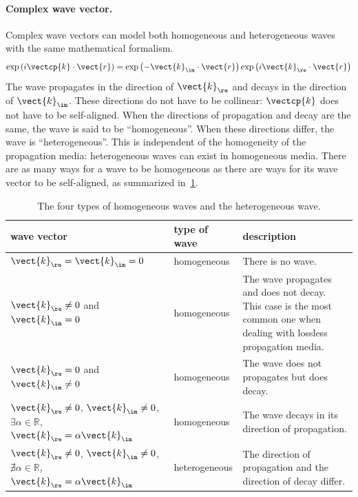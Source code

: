 \begin{refsection}
\paragraph{Complex wave vector.}
\label{sec:complex_wave_vector}
Complex wave vectors can model both homogeneous and heterogeneous waves with the same mathematical formalism.
\begin{equation}
    \exp \left( i \vectcp{k} \cdot \vect{r} \right)
    =
    \exp \left( - \vect{k}_\im \cdot \vect{r} \right)
    \exp \left( i \vect{k}_\re \cdot \vect{r} \right)
\end{equation}
The wave propagates in the direction of $\vect{k}_\re$
and decays in the direction of $\vect{k}_\im$.
These directions do not have to be collinear: $\vectcp{k}$ does not have to be self-aligned.
When the directions of propagation and decay are the same, the wave is said to be ``homogeneous''.
When these directions differ, the wave is ``heterogeneous''.
This is independent of the homogeneity of the propagation media: heterogeneous waves can exist in homogeneous media.
There are as many ways for a wave to be homogeneous as there are ways for its wave vector to be self-aligned, as summarized in~\cref{tab:types_homo_hetero_waves}.
\begin{table}
    \centering
    \begin{tabularx}{\textwidth}{p{3cm}lX}
        \toprule
        wave vector & type of wave & description\\
        \midrule
                $\vect{k}_\re = \vect{k}_\im = 0$
                &
                homogeneous
                &
                There is no wave.
            \\
                $\vect{k}_\re \neq 0$ and $\vect{k}_\im = 0$
                &
                homogeneous
                &
                The wave propagates and does not decay.
                This case is the most common one when dealing with
                lossless propagation media.
            \\
                $\vect{k}_\re = 0$ and $\vect{k}_\im \neq 0$
                &
                homogeneous
                &
                The wave does not propagates but does decay.
            \\
                $\vect{k}_\re \neq 0$, $\vect{k}_\im \neq 0$, $\exists \alpha \in \mathbb{R}$, $\vect{k}_\re = \alpha \vect{k}_\im$
                &
                homogeneous
                &
                The wave decays in its direction of propagation.
            \\
                $\vect{k}_\re \neq 0$, $\vect{k}_\im \neq 0$, $\nexists \alpha \in \mathbb{R}$, $\vect{k}_\re = \alpha \vect{k}_\im$
                &
                heterogeneous
                &
                The direction of propagation and the direction of decay differ.
            \\
        \bottomrule
    \end{tabularx}
    \caption{The four types of homogeneous waves and the heterogeneous wave.}
    \label{tab:types_homo_hetero_waves}
\end{table}


\end{refsection}
